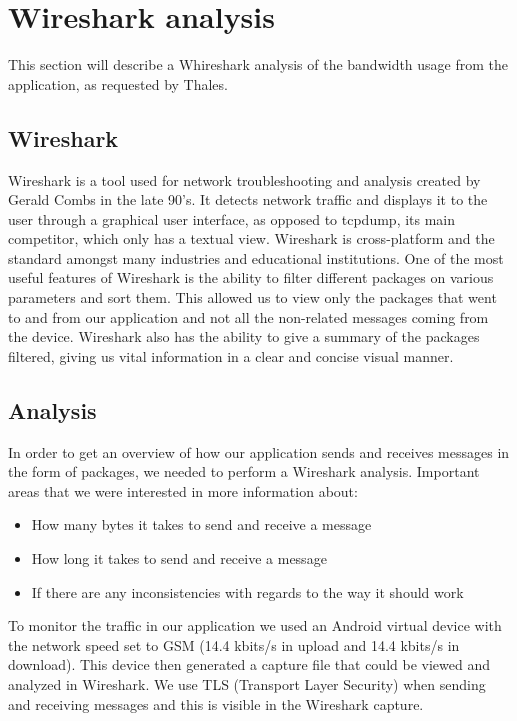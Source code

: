 \newpage

\section{Wireshark analysis}
This section will describe a Whireshark analysis of the bandwidth usage from the application, as requested by Thales.

\subsection{Wireshark}
Wireshark is a tool used for network troubleshooting and analysis created by Gerald Combs in the late 90’s. It detects network traffic and displays it to the user through a graphical user interface, as opposed to tcpdump, its main competitor, which only has a textual view. Wireshark is cross-platform and the standard amongst many industries and educational institutions. 
\newline
\newline
One of the most useful features of Wireshark is the ability to filter different packages on various parameters and sort them. This allowed us to view only the packages that went to and from our application and not all the non-related messages coming from the device. Wireshark also has the ability to give a summary of the packages filtered, giving us vital information in a clear and concise visual manner. 

\subsection{Analysis}
In order to get an overview of how our application sends and receives messages in the form of packages, we needed to perform a Wireshark analysis. Important areas that we were interested in more information about:
\begin{itemize}
\item{}How many bytes it takes to send and receive a message
\item{}How long it takes to send and receive a message
\item{}If there are any inconsistencies with regards to the way it should work
\end{itemize}

To monitor the traffic in our application we used an Android virtual device with the network speed set to GSM (14.4 kbits/s in upload and 14.4 kbits/s in download). This device then generated a capture file that could be viewed and analyzed in Wireshark.
\newline
\newline
We use TLS (Transport Layer Security) when sending and receiving messages and this is visible in the Wireshark capture. 

